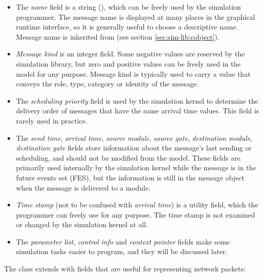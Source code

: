 \begin{itemize}
  \item The \textit{name} field is a string (),
    which can be freely used by the simulation programmer. The message
    name is displayed at many places in the graphical runtime interface,
    so it is generally useful to choose a descriptive name. Message name
    is inherited from  (see section
    \ref{sec:sim-lib:cobject}).
  \item \textit{Message kind} is an integer field.
    Some negative values are reserved by the simulation library, but zero
    and positive values can be freely used in the model for any purpose.
    Message kind is typically used to carry a value that conveys the
    role, type, category or identity of the message.
  \item The \textit{scheduling priority} field is used by the simulation
    kernel to determine the delivery order of messages that have the same
    arrival time values. This field is rarely used in practice.
  \item The \textit{send time}, \textit{arrival time}, \textit{source module},
    \textit{source gate}, \textit{destination module}, \textit{destination gate}
    fields store information about the message's last sending or scheduling,
    and should not be modified from the model. These fields are primarily
    used internally by the simulation kernel while the message is in the
    future events set (FES), but the information is still in
    the message object when the message is delivered to a module.
  \item \textit{Time stamp} (not to be confused with \textit{arrival time})
    is a utility field, which the programmer can freely use for any purpose.
    The time stamp is not examined or changed by the simulation kernel at all.
  \item The \textit{parameter list}, \textit{control info} and
    \textit{context pointer} fields make some simulation tasks easier
    to program, and they will be discussed later.
\end{itemize}

The  class extends  with fields that are
useful for representing network packets:

